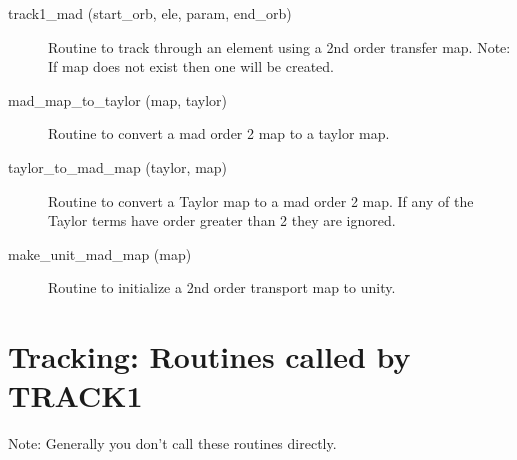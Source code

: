 \begin{description}
\label{r:track1.mad}
\item[track1_mad (start_orb, ele, param, end_orb)] \Newline 
     Routine to track through an element using a 2nd order transfer map.
     Note: If map does not exist then one will be created. 

\label{r:mad.map.to.taylor}
\item[mad_map_to_taylor (map, taylor)] \Newline 
     Routine to convert a mad order 2 map to a taylor map.

\label{r:taylor.to.mad.map}
\item[taylor_to_mad_map (taylor, map)] \Newline 
     Routine to convert a Taylor map to a mad order 2 map.
     If any of the Taylor terms have order greater than 2 they are ignored.

\label{r:make.unit.mad.map}
\item[make_unit_mad_map (map)] \Newline 
     Routine to initialize a 2nd order transport map to unity.


\end{description}

\section{Tracking: Routines called by TRACK1}
\label{r:track1.call}   

Note: Generally you don't call these routines directly.

